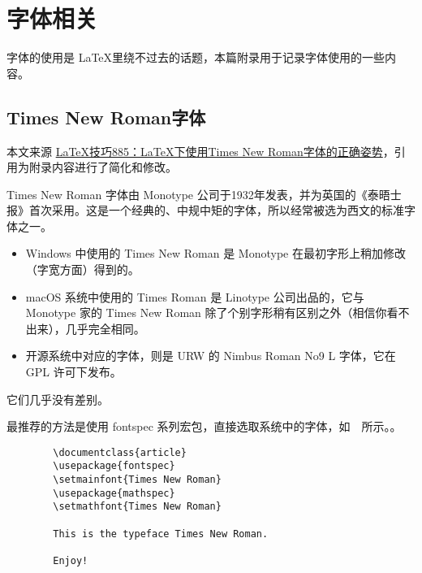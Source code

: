 \chapter{字体相关}

字体的使用是 \LaTeX 里绕不过去的话题，本篇附录用于记录字体使用的一些内容。

\section{Times New Roman字体}
本文来源 \href{https://www.latexstudio.net/archives/9323.html}{LaTeX技巧885：LaTeX下使用Times New Roman字体的正确姿势}，引用为附录内容进行了简化和修改。

Times New Roman 字体由 Monotype 公司于1932年发表，并为英国的《泰晤士报》首次采用。这是一个经典的、中规中矩的字体，所以经常被选为西文的标准字体之一。

\begin{itemize}
    \item Windows 中使用的 Times New Roman 是 Monotype 在最初字形上稍加修改（字宽方面）得到的。
    \item macOS 系统中使用的 Times Roman 是 Linotype 公司出品的，它与 Monotype 家的 Times New Roman 除了个别字形稍有区别之外（相信你看不出来），几乎完全相同。
    \item 开源系统中对应的字体，则是 URW 的 Nimbus Roman No9 L 字体，它在 GPL 许可下发布。
\end{itemize}

它们几乎没有差别。

最推荐的方法是使用 fontspec 系列宏包，直接选取系统中的字体，如~~所示。。

\begin{listing}[H]
    \begin{verbatim}
        \documentclass{article}
        \usepackage{fontspec}
        \setmainfont{Times New Roman}
        \usepackage{mathspec}
        \setmathfont{Times New Roman}
        
        This is the typeface Times New Roman.
        
        Enjoy!
        
    \end{verbatim}
    \caption{引用 fontspec 宏包使用 Times New Roman 字体}
\end{listing}